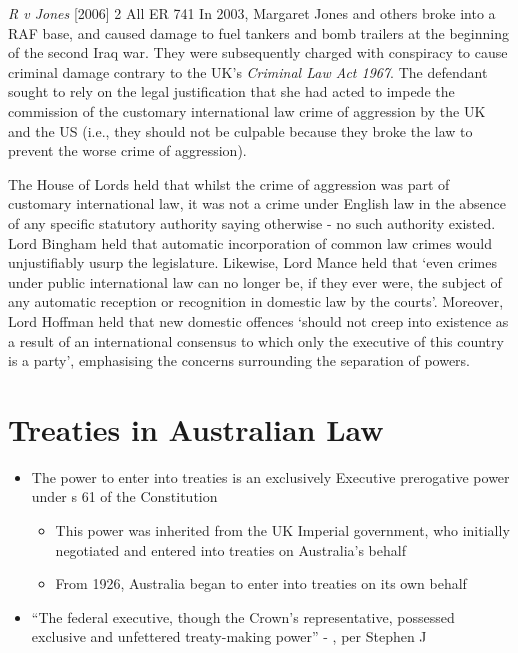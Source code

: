 \begin{casedetails}{\textit{R v Jones} [2006] 2 All ER 741}
    \flushleft
    In 2003, Margaret Jones and others broke into a RAF base, and caused damage to fuel tankers and bomb trailers at the beginning of the second Iraq war. They were subsequently charged with conspiracy to cause criminal damage contrary to the UK's \textit{Criminal Law Act 1967}. The defendant sought to rely on the legal justification that she had acted to impede the commission of the customary international law crime of aggression by the UK and the US (i.e., they should not be culpable because they broke the law to prevent the worse crime of aggression).

    \vspace{\baselineskip}

    The House of Lords held that whilst the crime of aggression was part of customary international law, it was not a crime under English law in the absence of any specific statutory authority saying otherwise - no such authority existed. Lord Bingham held that automatic incorporation of common law crimes would unjustifiably usurp the legislature. Likewise, Lord Mance held that `even crimes under public international law can no longer be, if they ever were, the subject of any automatic reception or recognition in domestic law by the courts'. Moreover, Lord Hoffman held that new domestic offences `should not creep into existence as a result of an international consensus to which only the executive of this country is a party', emphasising the concerns surrounding the separation of powers.
\end{casedetails}

\section{Treaties in Australian Law}
\begin{itemize}
    \item The power to enter into treaties is an exclusively Executive prerogative power under s 61 of the Constitution
    \begin{itemize}
        \item This power was inherited from the UK Imperial government, who initially negotiated and entered into treaties on Australia's behalf
        \item From 1926, Australia began to enter into treaties on its own behalf
    \end{itemize}
    \item ``The federal executive, though the Crown's representative, possessed exclusive and unfettered treaty-making power'' - , per Stephen J
\end{itemize}

